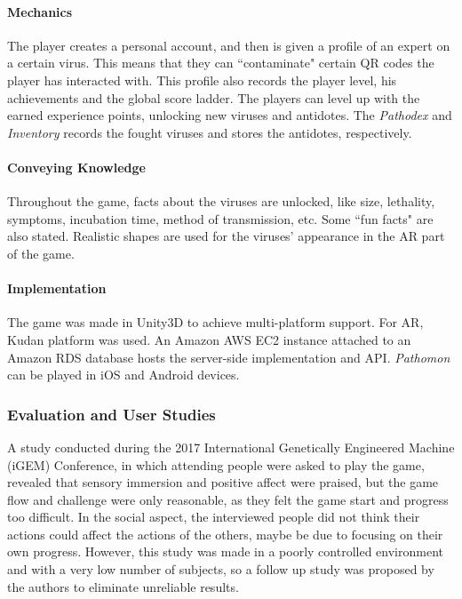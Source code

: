 \documentclass[runningheads]{llncs}
\begin{document}
\paragraph{Mechanics} The player creates a personal account, and then is given a profile of an expert on a certain virus. This means that they can ``contaminate" certain QR codes the player has interacted with. This profile also records the player level, his achievements and the global score ladder. The players can level up with the earned experience points, unlocking new viruses and antidotes. The \textit{Pathodex} and \textit{Inventory} records the fought viruses and stores the antidotes, respectively.

\paragraph{Conveying Knowledge} Throughout the game, facts about the viruses are unlocked, like size, lethality, symptoms, incubation time, method of transmission, etc. Some ``fun facts" are also stated. Realistic shapes are used for the viruses' appearance in the AR part of the game.

\paragraph{Implementation} The game was made in Unity3D to achieve multi-platform support. For AR, Kudan platform was used. An Amazon AWS EC2 instance attached to an Amazon RDS database hosts the server-side implementation and API. \textit{Pathomon} can be played in iOS and Android devices.

\subsubsection{Evaluation and User Studies}
\par A study conducted during the 2017 International Genetically Engineered Machine (iGEM) Conference, in which attending people were asked to play the game, revealed that sensory immersion and positive affect were praised, but the game flow and challenge were only reasonable, as they felt the game start and progress too difficult. In the social aspect, the interviewed people did not think their actions could affect the actions of the others, maybe be due to focusing on their own progress. However, this study was made in a poorly controlled environment and with a very low number of subjects, so a follow up study was proposed by the authors to eliminate unreliable results.
\end{document}
